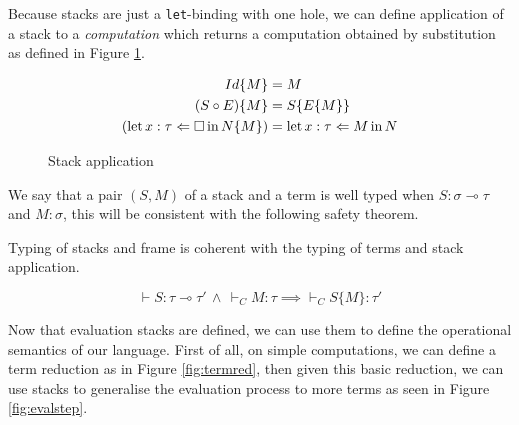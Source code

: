 Because stacks are just a \texttt{let}-binding with one hole, we can define 
application of a stack to a \emph{computation} which returns a computation
obtained by substitution as defined in Figure \ref{fig:stackapplication}.

\begin{figure}[h]
    \begin{align*}
        Id\{ M \} &= M \\
        (S \circ E) \{ M \} &= S \{ E \{ M \} \} \\
        (\Bind{\square}{x : \tau}{N} \{ M \}) &= \Bind{M}{x : \tau}{N}
    \end{align*}
    \caption{Stack application}
    \label{fig:stackapplication}
\end{figure}


We say that a pair $(S,M)$ of a stack and a term is well 
typed when $S : \sigma \multimap \tau$ and $M : \sigma$, 
this will be consistent with the following safety theorem.

\begin{alemma}[Safety]
    Typing of stacks and frame is coherent
    with the typing of terms and stack application.

    \begin{equation*}
        \vdash S : \tau \multimap \tau' \, \wedge \, 
        \vdash_C M : \tau
        \implies
        \vdash_C S\{M\} : \tau'
    \end{equation*}
\end{alemma}

Now that evaluation stacks are defined, we can use them to define 
the operational semantics of our language. First of all, on 
simple computations, we can define a term reduction 
as in Figure \ref{fig:termred}, then given this basic 
reduction, we can use stacks to generalise the evaluation 
process to more terms as seen in Figure \ref{fig:evalstep}.


